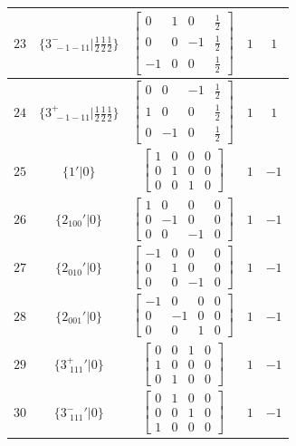 \documentclass[fleqn,8pt]{jsarticle}
\begin{document}
\begin{longtable}{ccccc}
$ 23 $ & $ \{3^{-}_{\,\,-1-11}|\frac{1}{2} \frac{1}{2} \frac{1}{2}\} $ & $ \begin{bmatrix} 0 & 1 & 0 & \frac{1}{2} \\ 0 & 0 & -1 & \frac{1}{2} \\ -1 & 0 & 0 & \frac{1}{2} \end{bmatrix} $ & $ 1 $ & $ 1 $ \\ \hline
$ 24 $ & $ \{3^{+}_{\,\,-1-11}|\frac{1}{2} \frac{1}{2} \frac{1}{2}\} $ & $ \begin{bmatrix} 0 & 0 & -1 & \frac{1}{2} \\ 1 & 0 & 0 & \frac{1}{2} \\ 0 & -1 & 0 & \frac{1}{2} \end{bmatrix} $ & $ 1 $ & $ 1 $ \\ \hline
$ 25 $ & $ \{1{}'|0\} $ & $ \begin{bmatrix} 1 & 0 & 0 & 0 \\ 0 & 1 & 0 & 0 \\ 0 & 0 & 1 & 0 \end{bmatrix} $ & $ 1 $ & $ -1 $ \\ \hline
$ 26 $ & $ \{2{}_{100}{}'|0\} $ & $ \begin{bmatrix} 1 & 0 & 0 & 0 \\ 0 & -1 & 0 & 0 \\ 0 & 0 & -1 & 0 \end{bmatrix} $ & $ 1 $ & $ -1 $ \\ \hline
$ 27 $ & $ \{2{}_{010}{}'|0\} $ & $ \begin{bmatrix} -1 & 0 & 0 & 0 \\ 0 & 1 & 0 & 0 \\ 0 & 0 & -1 & 0 \end{bmatrix} $ & $ 1 $ & $ -1 $ \\ \hline
$ 28 $ & $ \{2{}_{001}{}'|0\} $ & $ \begin{bmatrix} -1 & 0 & 0 & 0 \\ 0 & -1 & 0 & 0 \\ 0 & 0 & 1 & 0 \end{bmatrix} $ & $ 1 $ & $ -1 $ \\ \hline
$ 29 $ & $ \{3^{+}_{\,\,111}{}'|0\} $ & $ \begin{bmatrix} 0 & 0 & 1 & 0 \\ 1 & 0 & 0 & 0 \\ 0 & 1 & 0 & 0 \end{bmatrix} $ & $ 1 $ & $ -1 $ \\ \hline
$ 30 $ & $ \{3^{-}_{\,\,111}{}'|0\} $ & $ \begin{bmatrix} 0 & 1 & 0 & 0 \\ 0 & 0 & 1 & 0 \\ 1 & 0 & 0 & 0 \end{bmatrix} $ & $ 1 $ & $ -1 $ \\ \hline

\end{longtable}
\end{document}
